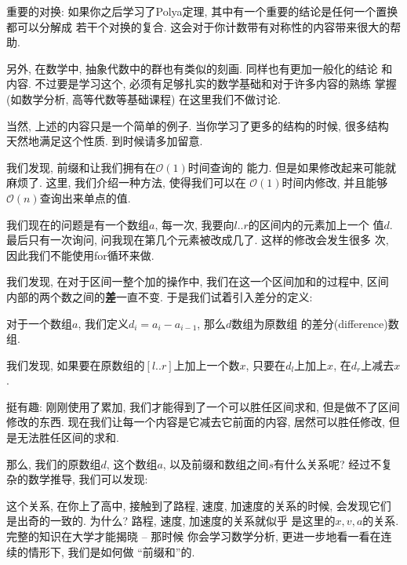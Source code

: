 \begin{remark}
    重要的对换: 如果你之后学习了Polya定理, 其中有一个重要的结论是任何一个置换都可以分解成
    若干个对换的复合. 这会对于你计数带有对称性的内容带来很大的帮助. 
    
    另外, 在数学中, 抽象代数中的群也有类似的刻画. 同样也有更加一般化的结论
    和内容. 不过要是学习这个, 必须有足够扎实的数学基础和对于许多内容的熟练
    掌握(如数学分析, 高等代数等基础课程)
    在这里我们不做讨论. 
\end{remark}

当然, 上述的内容只是一个简单的例子. 当你学习了更多的结构的时候, 很多结构
天然地满足这个性质. 到时候请多加留意. 

 我们发现, 前缀和让我们拥有在$\mathcal O(1)$时间查询的
能力. 但是如果修改起来可能就麻烦了. 这里, 我们介绍一种方法, 使得我们可以在
$\mathcal O(1)$时间内修改, 并且能够$\mathcal O(n)$查询出来单点的值. 

我们现在的问题是有一个数组$a$, 每一次, 我要向$l..r$的区间内的元素加上一个
值$d$. 最后只有一次询问, 问我现在第几个元素被改成几了. 这样的修改会发生很多
次, 因此我们不能使用for循环来做. 

我们发现, 在对于区间一整个加的操作中, 我们在这一个区间加和的过程中, 区间
内部的两个数之间的\textbf{差}一直不变. 于是我们试着引入差分的定义: 

\begin{definition}
    对于一个数组$a$, 我们定义$d_i=a_i-a_{i-1}$, 那么$d$数组为原数组
    的差分(difference)数组. 
\end{definition}

我们发现, 如果要在原数组的$[l..r]$上加上一个数$x$, 只要在$d_l$上加上$x$, 
在$d_r$上减去$x$. 

挺有趣: 刚刚使用了累加, 我们才能得到了一个可以胜任区间求和, 但是做不了区间
修改的东西. 现在我们让每一个内容是它减去它前面的内容, 居然可以胜任修改, 
但是无法胜任区间的求和. 

那么, 我们的原数组$d$, 这个数组$a$, 以及前缀和数组之间$s$有什么关系呢? 
经过不复杂的数学推导, 我们可以发现: 


\begin{remark}
    这个关系, 在你上了高中, 接触到了路程, 速度, 加速度的关系的时候, 
    会发现它们是出奇的一致的. 为什么? 路程, 速度, 加速度的关系就似乎
    是这里的$x, v,a$的关系. 完整的知识在大学才能揭晓 -- 那时候
    你会学习数学分析, 更进一步地看一看在连续的情形下, 我们是如何做
    ``前缀和''的. 
\end{remark}

